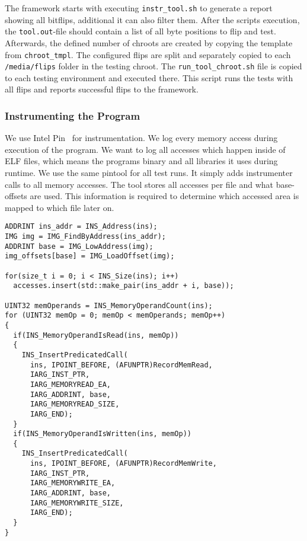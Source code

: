 The framework starts with executing \texttt{instr\_tool.sh} to generate a report
showing all bitflips, additional it can also filter them. After the
script\textquotesingle s execution, the \texttt{tool.out}-file should contain a
list of all byte positions to flip and test. Afterwards, the defined number of
chroots are created by copying the template from \texttt{chroot\_tmpl}. The
configured flips are split and separately copied to each \texttt{/media/flips}
folder in the testing chroot. The \texttt{run\_tool\_chroot.sh} file is copied
to each testing environment and executed there. This script runs the tests with
all flips and reports successful flips to the framework.

\subsubsection{Instrumenting the Program}

We use Intel Pin~\cite{pintool} for instrumentation.  We log every memory access
during execution of the program. We want to log all accesses which happen
inside of ELF files, which means the program\textquotesingle s binary and all
libraries it uses during runtime. We use the same pintool for all test runs. It
simply adds instrumenter calls to all memory accesses. The tool stores all
accesses per file and what base-offsets are used. This information is required
to determine which accessed area is mapped to which file later on.

\begin{minipage}{\linewidth}
\begin{lstlisting}[style=CStyle,
                   caption={Example C++ code for a pintool logging memory
accesses. At first, the tool stores the instruction bytes, and after the
operands are stored separately, depending on if they are writing or reading
memory.},
                   label={lst:pinlogcode}]
ADDRINT ins_addr = INS_Address(ins);
IMG img = IMG_FindByAddress(ins_addr);
ADDRINT base = IMG_LowAddress(img);
img_offsets[base] = IMG_LoadOffset(img);

for(size_t i = 0; i < INS_Size(ins); i++)
  accesses.insert(std::make_pair(ins_addr + i, base));

UINT32 memOperands = INS_MemoryOperandCount(ins);
for (UINT32 memOp = 0; memOp < memOperands; memOp++)
{
  if(INS_MemoryOperandIsRead(ins, memOp))
  {
    INS_InsertPredicatedCall(
      ins, IPOINT_BEFORE, (AFUNPTR)RecordMemRead,
      IARG_INST_PTR,
      IARG_MEMORYREAD_EA,
      IARG_ADDRINT, base,
      IARG_MEMORYREAD_SIZE,
      IARG_END);
  }
  if(INS_MemoryOperandIsWritten(ins, memOp))
  {
    INS_InsertPredicatedCall(
      ins, IPOINT_BEFORE, (AFUNPTR)RecordMemWrite,
      IARG_INST_PTR,
      IARG_MEMORYWRITE_EA,
      IARG_ADDRINT, base,
      IARG_MEMORYWRITE_SIZE,
      IARG_END);
  }
}
\end{lstlisting}
\end{minipage}

